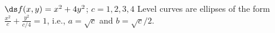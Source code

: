 {$\ds f(x,y) = x^2+4y^2$; $c = 1,2,3,4$\label{12_01_ex_22}}
{Level curves are ellipses of the form $\frac{x^2}{c}+\frac{y^2}{c/4}=1$, i.e., $a=\sqrt{c}$ and $b=\sqrt{c}/2$.\\
}